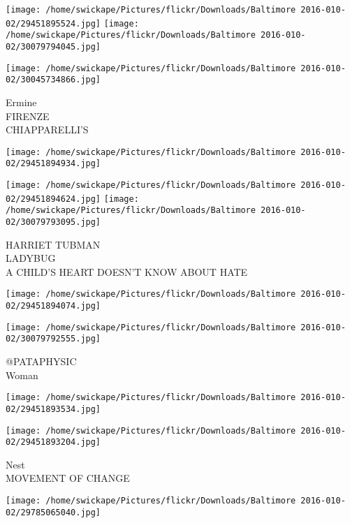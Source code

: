 \documentclass[10pt,letterpaper]{article}
\begin{document}
\texttt{[image: /home/swickape/Pictures/flickr/Downloads/Baltimore 2016-010-02/29451895524.jpg]}
\texttt{[image: /home/swickape/Pictures/flickr/Downloads/Baltimore 2016-010-02/30079794045.jpg]}

\vspace{0.25in}
\texttt{[image: /home/swickape/Pictures/flickr/Downloads/Baltimore 2016-010-02/30045734866.jpg]}

Ermine\\
FIRENZE\\
CHIAPPARELLI'S\\
\pagebreak

\texttt{[image: /home/swickape/Pictures/flickr/Downloads/Baltimore 2016-010-02/29451894934.jpg]}

\vspace{0.25in}
\texttt{[image: /home/swickape/Pictures/flickr/Downloads/Baltimore 2016-010-02/29451894624.jpg]}
\texttt{[image: /home/swickape/Pictures/flickr/Downloads/Baltimore 2016-010-02/30079793095.jpg]}

HARRIET TUBMAN\\
LADYBUG\\
A CHILD'S HEART DOESN'T KNOW ABOUT HATE\\
\pagebreak

\texttt{[image: /home/swickape/Pictures/flickr/Downloads/Baltimore 2016-010-02/29451894074.jpg]}

\vspace{0.25in}
\texttt{[image: /home/swickape/Pictures/flickr/Downloads/Baltimore 2016-010-02/30079792555.jpg]}

@PATAPHYSIC\\
Woman\\
\pagebreak

\texttt{[image: /home/swickape/Pictures/flickr/Downloads/Baltimore 2016-010-02/29451893534.jpg]}

\vspace{0.25in}
\texttt{[image: /home/swickape/Pictures/flickr/Downloads/Baltimore 2016-010-02/29451893204.jpg]}

Nest\\
MOVEMENT OF CHANGE\\
\pagebreak

\texttt{[image: /home/swickape/Pictures/flickr/Downloads/Baltimore 2016-010-02/29785065040.jpg]}
\end{document}
